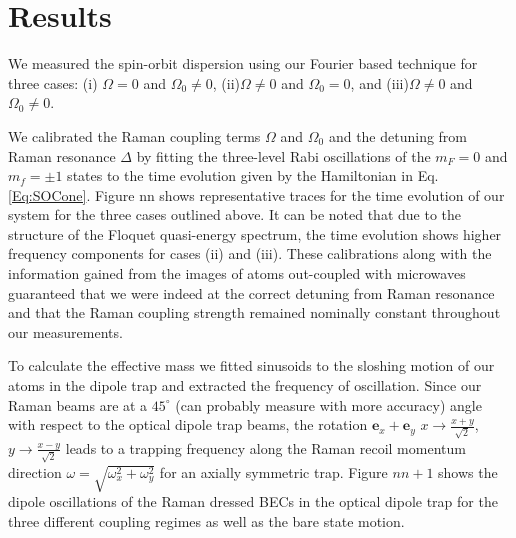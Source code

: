 \section{Results}

We measured the spin-orbit dispersion using our Fourier based technique  for three cases: (i) $\Omega=0$ and $\Omega_0\neq0$, (ii)$\Omega\neq0$ and $\Omega_0=0$, and (iii)$\Omega\neq0$ and $\Omega_0\neq0$. 


We calibrated the Raman coupling terms $\Omega$ and $\Omega_0$ and the detuning from Raman resonance $\Delta$ by fitting the three-level Rabi oscillations of the $m_F=0$ and $m_f=\pm 1$ states to the time evolution given by the Hamiltonian in Eq. \ref{Eq:SOCone}. Figure nn shows representative traces for the time evolution of our system for the three cases outlined above. It can be noted that due to the structure of the Floquet quasi-energy spectrum, the time evolution shows higher frequency components for cases (ii) and (iii). These calibrations along with the information gained from the images of atoms out-coupled  with microwaves guaranteed that we were indeed at the correct detuning from Raman resonance and that the Raman coupling strength remained nominally constant throughout our measurements. 



To calculate the effective mass we fitted sinusoids to the sloshing motion of our atoms in the dipole trap and extracted the frequency of oscillation. Since our Raman beams are at a $45^{\circ}$ (can probably measure with more accuracy) angle with respect to the optical dipole trap beams, the rotation $\mathbf{e}_x+\mathbf{e}_y$   $x\rightarrow\frac{x+y}{\sqrt{2}}$, $y\rightarrow\frac{x-y}{\sqrt{2}}$ leads to a trapping frequency along the Raman recoil momentum direction
$\omega=\sqrt{\omega_x^2+\omega_y^2}$ for an axially symmetric trap.  
Figure $nn+1$ shows the dipole oscillations of the Raman dressed BECs in the optical dipole trap for the three different coupling regimes as well as the bare state motion. 


